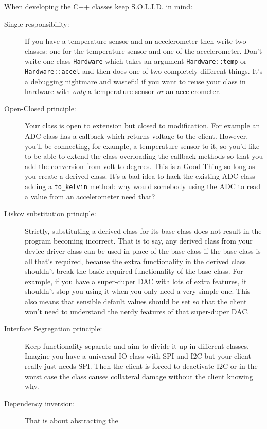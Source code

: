 \documentclass[12pt]{report}
\begin{document}
When developing the C++ classes keep 
\href{https://www.digitalocean.com/community/conceptual_articles/s-o-l-i-d-the-first-five-principles-of-object-oriented-design}{S.O.L.I.D.}
in mind:
\begin{description}
\item[Single responsibility:] If you have a temperature
sensor and an accelerometer then write two classes: one for the
temperature sensor and one of the accelerometer. Don't write one
class \texttt{Hardware} which takes an argument \texttt{Hardware::temp}
or \texttt{Hardware::accel} and then does one of two completely different
things. It's a debugging nightmare and wasteful if you want to reuse
your class in hardware with \emph{only} a temperature sensor \emph{or}
an accelerometer.
\item[Open-Closed principle:] Your class is open to extension but
  closed to modification. For example an ADC class
  has a callback which returns voltage to the client. However,
  you'll be connecting, for example, a temperature sensor to
  it, so you'd like to be able to extend the class
  overloading the callback methods so that you add the conversion
  from volt to degrees. This is a Good Thing\texttrademark{} so long as
  you create a derived class. It's a bad idea to hack the existing
  ADC class adding a \texttt{to\_kelvin} method: why would somebody
  using the ADC to read a value from an accelerometer need that?
\item[Liskov substitution principle:] Strictly, substituting
  a derived class for its base class does not result in the program
  becoming incorrect. That is to say, any derived class from
  your device driver class can be used in place of the base class if
  the base class is all that's required, because the extra
  functionality in the derived class shouldn't break the basic
  required functionality of the base class. For example, if you have a
  super-duper DAC with lots of extra features, it shouldn't stop you
  using it when you only need a very simple one. This also means
  that sensible default values should be set so that the client
  won't need to understand the nerdy features of that super-duper DAC.
\item[Interface Segregation principle:]
  Keep functionality separate and aim to divide it up in different
  classes. Imagine you have a universal IO class with SPI and I2C
  but your client really just needs SPI. Then the client is forced
  to deactivate I2C or in the worst case the class causes collateral
  damage without the client knowing why.
\item[Dependency inversion:] That is about abstracting the

\end{description}
\end{document}
